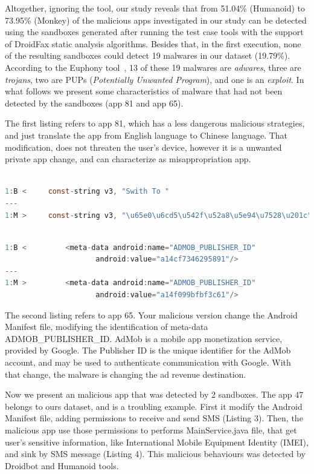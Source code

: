 Altogether, ignoring the \joke tool, our study reveals that from 51.04\% (Humanoid)
to 73.95\% (Monkey) of the malicious apps investigated in our study can be
detected using the sandboxes generated after running the test case tools with the support of DroidFax static analysis algorithms. Besides that, in the first execution, none of the resulting sandboxes could detect 19 malwares in our dataset (19.79\%). According to the Euphony tool~\cite{hurier2017euphony}, 13 of these 19 malwares are \emph{adwares}, three are \emph{trojans}, two are PUPs (\emph{Potentially Unwanted Program}), and one is an \emph{exploit}. In what follows we present some characteristics of malware that had not been detected by the sandboxes (app 81 and app 65). 

The first listing refers to app 81, which has a less dangerous malicious strategies, and just translate the app from English language to Chinese language. That modification, does not threaten the user's device, however it is a unwanted private app change, and can characterize as misappropriation app.

\begin{lstlisting}[caption= smali/mobi/infolife/cachepro/h.smali - App81,language=Java, basicstyle=\tiny,label={lst:app81}]

1:B <     const-string v3, "Swith To "
---
1:M >     const-string v3, "\u65e0\u6cd5\u542f\u52a8\u5e94\u7528\u201c"
\end{lstlisting}

\begin{lstlisting}[caption=AndroidManifest.xml - App 65, language=Java, basicstyle=\tiny,label={lst:app65}]

1:B <         <meta-data android:name="ADMOB_PUBLISHER_ID"
                     android:value="a14cf7346295891"/>
---
1:M >         <meta-data android:name="ADMOB_PUBLISHER_ID"
                     android:value="a14f099bfbf3c61"/>
\end{lstlisting}


The second listing refers to app 65. Your malicious version change the Android Manifest file, modifying the identification of meta-data ADMOB\_PUBLISHER\_ID. AdMob \cite{admob} is a mobile app monetization service, provided by Google. The Publisher ID \cite{publisherID} is the unique identifier for the AdMob account, and may be used to authenticate communication with Google. With that change, the malware is changing the ad revenue destination. 

Now we present an malicious app that was detected by 2 sandboxes. The app 47 belongs to ours dataset, and is a troubling example. First it modify the Android Manifest file, adding permissions to receive and send SMS (Listing 3). Then, the malicious app use those permissions to performs MainService.java file, that get user's sensitive information, like International Mobile Equipment Identity (IMEI), and sink by SMS message (Listing 4). This malicious behaviours was detected by Droidbot and Humanoid tools.

